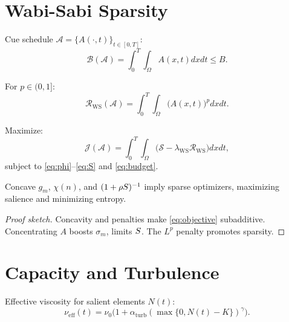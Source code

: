 {{{{{{{{{{{{{{{{{{\section{Wabi-Sabi Sparsity}
\label{sec:rsvp-wabisabi}
\begin{definition}
\label{def:budget}
Cue schedule \(\mathcal{A} = \{A(\cdot,t)\}_{t \in [0,T]}\):
\begin{equation}
\label{eq:budget}
\mathcal{B}(\mathcal{A}) = \int_{0}^{T} \int_{\Omega} A(x,t) dx dt \leq B.
\end{equation}
\end{definition}

\begin{definition}
\label{def:ws}
For \(p \in (0,1]\):
\begin{equation}
\label{eq:ws-reg}
\mathcal{R}_{\mathrm{WS}}(\mathcal{A}) = \int_{0}^{T} \int_{\Omega} \big(A(x,t)\big)^p dx dt.
\end{equation}
\end{definition}

\begin{definition}[Objective]
\label{def:objective}
Maximize:
\begin{equation}
\label{eq:objective}
\mathcal{J}(\mathcal{A}) = \int_{0}^{T} \int_{\Omega} \big(\mathcal{S} - \lambda_{\mathrm{WS}} \mathcal{R}_{\mathrm{WS}}\big) dx dt,
\end{equation}
subject to \eqref{eq:phi}--\eqref{eq:S} and \eqref{eq:budget}.
\end{definition}

\begin{proposition}
\label{prop:sparsity}
Concave \(g_m\), \(\chi(n)\), and \((1 + \rho S)^{-1}\) imply sparse optimizers, maximizing salience and minimizing entropy.
\begin{proof}[Proof sketch]
Concavity and penalties make \eqref{eq:objective} subadditive. Concentrating \(A\) boosts \(\sigma_{m}\), limits \(S\). The \(L^p\) penalty promotes sparsity.
\end{proof}
\end{proposition}

\section{Capacity and Turbulence}
\label{sec:rsvp-turbulence}
\begin{definition}[Turbulence]
\label{def:turbulence}
Effective viscosity for salient elements \(N(t)\):
\begin{equation}
\label{eq:visc}
\nu_{\mathrm{eff}}(t) = \nu_0 \big(1 + \alpha_{\mathrm{turb}} (\max\{0, N(t) - K\})^\gamma \big).
\end{equation}
\end{definition}

}}}}}}}}}}}}}}}}}}
